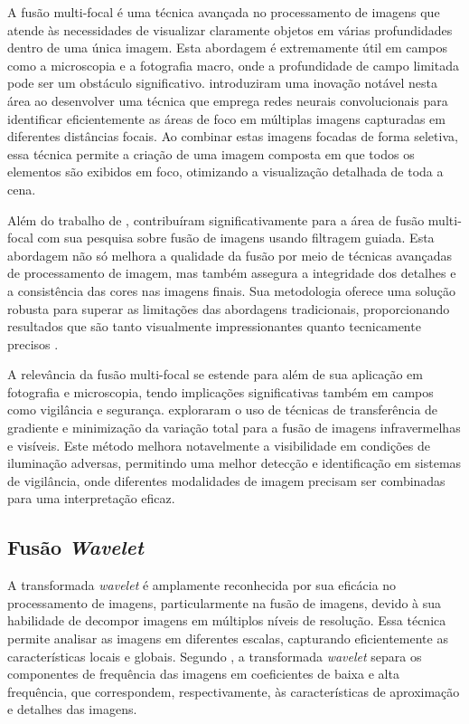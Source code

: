 A fusão multi-focal é uma técnica avançada no processamento de imagens que atende às necessidades de visualizar claramente objetos em várias profundidades dentro de uma única imagem. Esta abordagem é extremamente útil em campos como a microscopia e a fotografia macro, onde a profundidade de campo limitada pode ser um obstáculo significativo.  introduziram uma inovação notável nesta área ao desenvolver uma técnica que emprega redes neurais convolucionais para identificar eficientemente as áreas de foco em múltiplas imagens capturadas em diferentes distâncias focais. Ao combinar estas imagens focadas de forma seletiva, essa técnica permite a criação de uma imagem composta em que todos os elementos são exibidos em foco, otimizando a visualização detalhada de toda a cena.

Além do trabalho de ,  contribuíram significativamente para a área de fusão multi-focal com sua pesquisa sobre fusão de imagens usando filtragem guiada. Esta abordagem não só melhora a qualidade da fusão por meio de técnicas avançadas de processamento de imagem, mas também assegura a integridade dos detalhes e a consistência das cores nas imagens finais. Sua metodologia oferece uma solução robusta para superar as limitações das abordagens tradicionais, proporcionando resultados que são tanto visualmente impressionantes quanto tecnicamente precisos \cite{li2021multifocal}.

A relevância da fusão multi-focal se estende para além de sua aplicação em fotografia e microscopia, tendo implicações significativas também em campos como vigilância e segurança.  exploraram o uso de técnicas de transferência de gradiente e minimização da variação total para a fusão de imagens infravermelhas e visíveis. Este método melhora notavelmente a visibilidade em condições de iluminação adversas, permitindo uma melhor detecção e identificação em sistemas de vigilância, onde diferentes modalidades de imagem precisam ser combinadas para uma interpretação eficaz.

 \subsection{Fusão \textit{Wavelet}}\label{subsec:wavelet}
 A transformada \textit{wavelet} é amplamente reconhecida por sua eficácia no processamento de imagens, particularmente na fusão de imagens, devido à sua habilidade de decompor imagens em múltiplos níveis de resolução. Essa técnica permite analisar as imagens em diferentes escalas, capturando eficientemente as características locais e globais. Segundo , a transformada \textit{wavelet} separa os componentes de frequência das imagens em coeficientes de baixa e alta frequência, que correspondem, respectivamente, às características de aproximação e detalhes das imagens.

